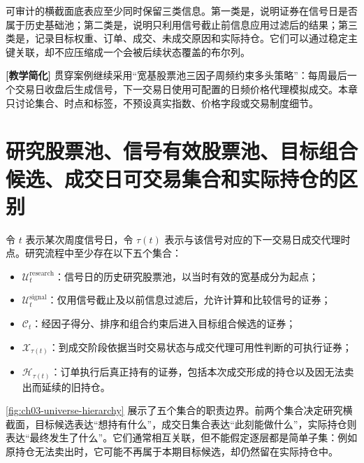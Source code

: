 可审计的横截面底表应至少同时保留三类信息。第一类是，说明证券在信号日是否属于历史基础池；第二类是，说明只利用信号截止前信息应用过滤后的结果；第三类是，记录目标权重、订单、成交、未成交原因和实际持仓。它们可以通过稳定主键关联，却不应压缩成一个会被后续状态覆盖的布尔列。

\begin{teachingbox}
\textbf{[教学简化]} 贯穿案例继续采用“宽基股票池三因子周频约束多头策略”：每周最后一个交易日收盘后生成信号，下一交易日使用可配置的日频价格代理模拟成交。本章只讨论集合、时点和标签，不预设真实指数、价格字段或交易制度细节。
\end{teachingbox}

\section{研究股票池、信号有效股票池、目标组合候选、成交日可交易集合和实际持仓的区别}

令 \(t\) 表示某次周度信号日，令 \(\tau(t)\) 表示与该信号对应的下一交易日成交代理时点。研究流程中至少存在以下五个集合：

\begin{itemize}
  \item \(\mathcal{U}^{\mathrm{research}}_t\)：信号日的历史研究股票池，以当时有效的宽基成分为起点；
  \item \(\mathcal{U}^{\mathrm{signal}}_t\)：仅用信号截止及以前信息过滤后，允许计算和比较信号的证券；
  \item \(\mathcal{C}_t\)：经因子得分、排序和组合约束后进入目标组合候选的证券；
  \item \(\mathcal{X}_{\tau(t)}\)：到成交阶段依据当时交易状态与成交代理可用性判断的可执行证券；
  \item \(\mathcal{H}_{\tau(t)}\)：订单执行后真正持有的证券，包括本次成交形成的持仓以及因无法卖出而延续的旧持仓。
\end{itemize}

\cref{fig:ch03-universe-hierarchy} 展示了五个集合的职责边界。前两个集合决定研究横截面，目标候选表达“想持有什么”，成交日集合表达“此刻能做什么”，实际持仓则表达“最终发生了什么”。它们通常相互关联，但不能假定逐层都是简单子集：例如原持仓无法卖出时，它可能不再属于本期目标候选，却仍然留在实际持仓中。


